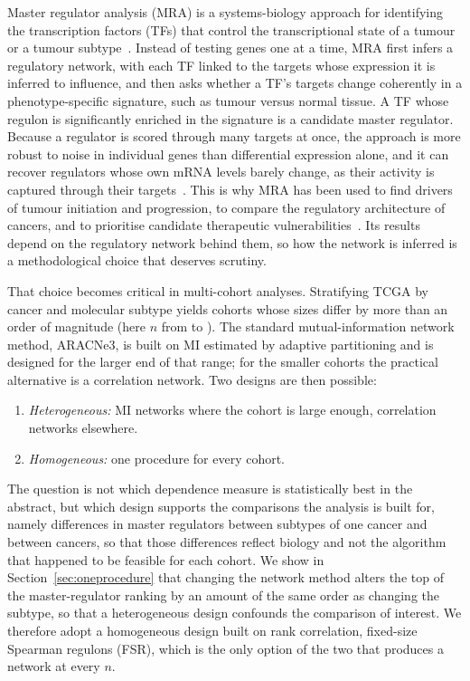 \documentclass[11pt,a4paper]{article}
\theoremstyle{plain}
\theoremstyle{remark}
\newcommand{\FSR}{FSR}
\begin{document}
Master regulator analysis (MRA) is a systems-biology approach for identifying the transcription factors (TFs) that control the transcriptional state of a tumour or a tumour subtype~\cite{carro2010,lefebvre2010}. Instead of testing genes one at a time, MRA first infers a regulatory network, with each TF linked to the targets whose expression it is inferred to influence, and then asks whether a TF's targets change coherently in a phenotype-specific signature, such as tumour versus normal tissue. A TF whose regulon is significantly enriched in the signature is a candidate master regulator. Because a regulator is scored through many targets at once, the approach is more robust to noise in individual genes than differential expression alone, and it can recover regulators whose own mRNA levels barely change, as their activity is captured through their targets~\cite{alvarez2016}. This is why MRA has been used to find drivers of tumour initiation and progression, to compare the regulatory architecture of cancers, and to prioritise candidate therapeutic vulnerabilities~\cite{califano2017}. Its results depend on the regulatory network behind them, so how the network is inferred is a methodological choice that deserves scrutiny.

That choice becomes critical in multi-cohort analyses. Stratifying TCGA by cancer and molecular subtype yields cohorts whose sizes differ by more than an order of magnitude (here $n$ from \Knmin{} to \Knmax{}). The standard mutual-information network method, ARACNe3, is built on MI estimated by adaptive partitioning and is designed for the larger end of that range; for the smaller cohorts the practical alternative is a correlation network. Two designs are then possible:
\begin{enumerate}
  \item \emph{Heterogeneous:} MI networks where the cohort is large enough, correlation networks elsewhere.
  \item \emph{Homogeneous:} one procedure for every cohort.
\end{enumerate}
The question is not which dependence measure is statistically best in the abstract, but which design supports the
comparisons the analysis is built for, namely differences in master regulators between subtypes of one cancer and between cancers,
so that those differences reflect biology and not the algorithm that happened to be feasible for each cohort.
We show in Section~\ref{sec:oneprocedure} that changing the network method alters the top of the master-regulator ranking by an amount of
the same order as changing the subtype, so that a heterogeneous design confounds the comparison of interest. We therefore
adopt a homogeneous design built on rank correlation, fixed-size Spearman regulons (\FSR), which is the only option of the two that produces a network at every $n$.
\end{document}
